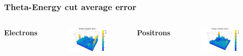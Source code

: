 \documentclass{beamer}
\begin{document}
		\begin{frame}
			\frametitle{Theta-Energy cut average error}
			\begin{columns}
				\centering
				\Large \textbf{Electrons}
				\begin{figure}
					\centering
					\includegraphics[width = 0.95 \linewidth]{../images/c_e_theta_energy_abs.png}
				\end{figure}
				\centering
				\Large \textbf{Positrons}
				\begin{figure}
					\centering
					\includegraphics[width = 0.95 \linewidth]{../images/c_p_theta_energy_abs.png}
				\end{figure}
			\end{columns}
		\end{frame}
\end{document}
